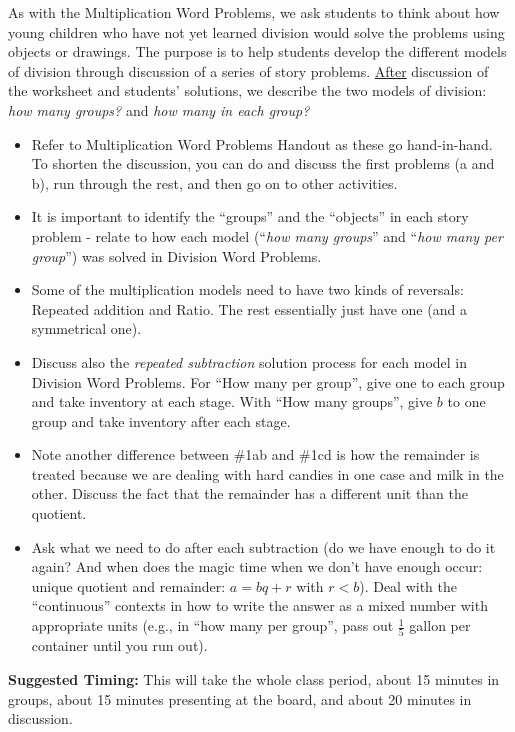 \documentclass{ximera}
\begin{document}
\newpage

\begin{instructorNotes}
As with the Multiplication Word Problems, we ask students to think about how young children who have not yet learned division would solve the problems using objects or drawings.  The purpose is to help students develop the different models of division through discussion of a series of story problems.  \underline{After} discussion of the worksheet and students' solutions, we describe the two models of division: {\em how many groups?} and {\em how many in each group? }

\begin{itemize}
	\item Refer to Multiplication Word Problems Handout as these go hand-in-hand.  To shorten the discussion, you can do and discuss the first problems (a and b), run through the rest, and then go on to other activities.
	\item It is important to identify the ``groups'' and the ``objects'' in each story problem - relate to how each model (``{\em how many groups}'' and ``{\em how many per group}'') was solved in Division Word Problems.
	\item Some of the multiplication models need to have two kinds of reversals:  Repeated addition and Ratio.  The rest essentially just have one (and a symmetrical one).  
	\item Discuss also the {\em repeated subtraction} solution process for each model in Division Word Problems.  For ``How many per group'', give one to each group and take inventory at each stage.  With ``How many groups'', give $b$ to one group and take inventory after each stage.
	\item Note another difference between \#1ab and \#1cd is how the remainder is treated because we are dealing with hard candies in one case and milk in the other.  Discuss the fact that the remainder has a different unit than the quotient.  
	\item Ask what we need to do after each subtraction (do we have enough to do it again? And when does the magic time when we don't have enough occur:  unique quotient and remainder:  $a = bq + r$ with $r < b$).  Deal with the ``continuous'' contexts in how to write the answer as a mixed number with appropriate units (e.g., in ``how many per group'', pass out $\frac15$ gallon per container until you run out). 
\end{itemize}



{\bf Suggested Timing:} This will take the whole class period, about 15 minutes in groups, about 15 minutes presenting at the board, and about 20 minutes in discussion.
\end{instructorNotes}
\end{document}
